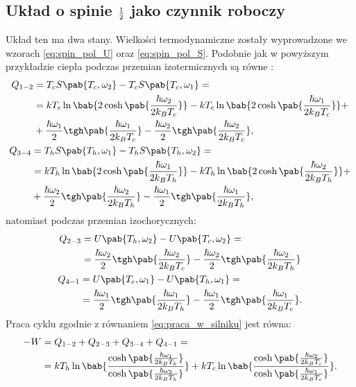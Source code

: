 \subsection{Układ o spinie \(\frac{1}{2}\) jako czynnik roboczy}
Układ ten ma dwa stany. Wielkości termodynamiczne zostały wyprowadzone we wzorach \eqref{eq:spin_pol_U} oraz \eqref{eq:spin_pol_S}. Podobnie jak w powyższym przykładzie ciepła podczas przemian izotermicznych są równe \cite{huang_stirling}:
\begin{gather}
\begin{split}
	Q_{1-2} &= T_c S\pab{T_c,\omega_2} - T_c S\pab{T_c,\omega_1} = \\ &=
	kT_c \ln\bab{2\cosh\pab{\frac{\hbar\omega_2}{2k_B T_c}}} -
	kT_c \ln\bab{2\cosh\pab{\frac{\hbar\omega_1}{2k_B T_c}}} + \\ &+
	\frac{\hbar\omega_1}{2} \tgh\pab{\frac{\hbar\omega_1}{2k_B T_c}} -
	\frac{\hbar\omega_2}{2} \tgh\pab{\frac{\hbar\omega_2}{2k_B T_c}},
\end{split} \\
\begin{split}
	Q_{3-4} &= T_h S\pab{T_h,\omega_1} - T_h S\pab{T_h,\omega_2} = \\ &=
	kT_h \ln\bab{2\cosh\pab{\frac{\hbar\omega_1}{2k_B T_h}}} -
	kT_h \ln\bab{2\cosh\pab{\frac{\hbar\omega_2}{2k_B T_h}}} + \\ &+
	\frac{\hbar\omega_2}{2} \tgh\pab{\frac{\hbar\omega_2}{2k_B T_h}} -
	\frac{\hbar\omega_1}{2} \tgh\pab{\frac{\hbar\omega_1}{2k_B T_h}},
\end{split}
\end{gather}
natomiast podczas przemian izochorycznych:
\begin{gather}
\begin{split}
	Q_{2-3} &= U\pab{T_h,\omega_2} - U\pab{T_c,\omega_2} = \\ &=
	\frac{\hbar\omega_2}{2}\tgh\pab{\frac{\hbar\omega_2}{2k_B T_c}} -
	\frac{\hbar\omega_2}{2}\tgh\pab{\frac{\hbar\omega_2}{2k_B T_h}}
\end{split} \\
\begin{split}
	Q_{4-1} &= U\pab{T_c,\omega_1} - U\pab{T_h,\omega_1} = \\ &=
	\frac{\hbar\omega_1}{2}\tgh\pab{\frac{\hbar\omega_1}{2k_B T_h}} -
	\frac{\hbar\omega_1}{2}\tgh\pab{\frac{\hbar\omega_1}{2k_B T_c}}.
\end{split}
\end{gather}
Praca cyklu zgodnie z równaniem \eqref{eq:praca_w_silniku} jest równa:
\begin{equation}
\begin{split}
	-W &= Q_{1-2} + Q_{2-3} + Q_{3-4} + Q_{4-1} = \\ &=
	kT_h \ln\bab{\frac{
	\cosh\pab{\frac{\hbar\omega_1}{2k_B T_h}}
	}{
	\cosh\pab{\frac{\hbar\omega_2}{2k_B T_h}}
	}} +
	kT_c \ln\bab{\frac{
	\cosh\pab{\frac{\hbar\omega_2}{2k_B T_c}}
	}{
	\cosh\pab{\frac{\hbar\omega_1}{2k_B T_c}}
	}}.
\end{split}
\end{equation}

